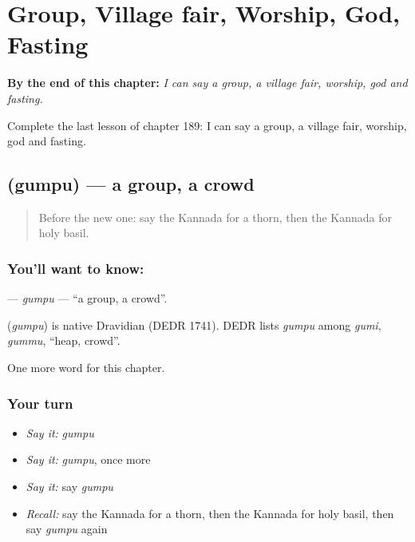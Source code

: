
\chapter{Group, Village fair, Worship, God, Fasting}
\label{ch:ka-group-village-fair-worship-god-fasting}

\begin{chapteropening}
\textbf{By the end of this chapter:} \emph{I can say a group, a village fair, worship, god and fasting.}

Complete the last lesson of chapter 189: I can say a group, a village fair, worship, god and fasting.
\end{chapteropening}

\section[\texorpdfstring{\kn{ಗುಂಪು} (gumpu)}{ಗುಂಪು (gumpu)}]{ (gumpu) — a group, a crowd}

\label{lesson:KA-C189-gumpu}



\begin{quote}
Before the new one: say the Kannada for a thorn, then the Kannada for holy basil.
\end{quote}

\subsection*{You'll want to know: }
\textbf{} — \emph{gumpu} — \textquotedblleft{}a group, a crowd\textquotedblright{}.

\begin{cousinweb}
\textbf{} (\emph{gumpu}) is native Dravidian (DEDR 1741). DEDR lists \emph{gumpu} among \emph{gumi}, \emph{gummu}, \textquotedblleft{}heap, crowd\textquotedblright{}.
\end{cousinweb}

\begin{grammarlens}[title={What you've built}]
One more word for this chapter.
\end{grammarlens}

\subsection*{Your turn}
\begin{itemize}
\raggedright
  \item \emph{Say it:} \emph{gumpu}
  \item \emph{Say it:} \emph{gumpu}, once more
  \item \emph{Say it:} say \emph{gumpu}
  \item \emph{Recall:} say the Kannada for a thorn, then the Kannada for holy basil, then say \emph{gumpu} again
\end{itemize}

